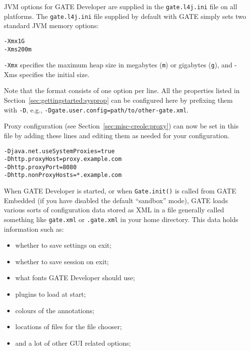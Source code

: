 JVM options for GATE Developer are supplied in the \texttt{gate.l4j.ini} file
on all platforms.  The \texttt{gate.l4j.ini} file supplied by default with GATE
simply sets two standard JVM memory options:
%
\begin{verbatim}
-Xmx1G
-Xms200m
\end{verbatim}
%
\texttt{-Xmx} specifies the maximum heap size in megabytes (\texttt{m}) or
gigabytes (\texttt{g}), and -Xms specifies the initial size. 

Note that the format consists of one option per line.  All the properties listed
in Section~\ref{sec:gettingstarted:sysprop} can be configured here by prefixing
them with \texttt{-D}, e.g., \texttt{-Dgate.user.config=path/to/other-gate.xml}.

Proxy configuration (see Section~\ref{sec:misc-creole:proxy}) can now be set in
this file by adding these lines and editing them as needed for your
configuration.
%
\begin{verbatim}
-Djava.net.useSystemProxies=true  
-Dhttp.proxyHost=proxy.example.com  
-Dhttp.proxyPort=8080  
-Dhttp.nonProxyHosts=*.example.com 
\end{verbatim}
%

When GATE Developer is started, or when {\tt Gate.init()} is called from GATE
Embedded (if you have disabled the default ``sandbox'' mode), GATE loads
various sorts of configuration data stored as XML in a file
generally called something like {\tt gate.xml} or {\tt .gate.xml} in your home
directory. This data holds information such as:
\begin{itemize}
  
\item whether to save settings on exit;

\item whether to save session on exit;

\item what fonts GATE Developer should use;

\item plugins to load at start;

\item colours of the annotations;

\item locations of files for the file chooser;

\item and a lot of other GUI related options;


\end{itemize}

